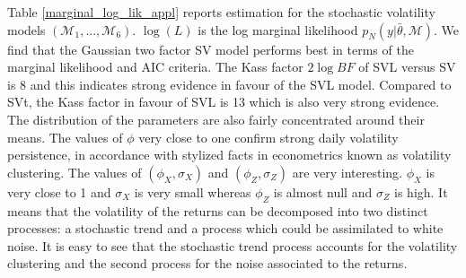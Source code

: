 \documentclass[11pt,a4,twosided,singlespacing,titlepagenumber=on]{scrreprt}
\numberwithin{equation}{chapter} %
\theoremstyle{remark}
\begin{document}
Table \ref{marginal_log_lik_appl} reports estimation for the stochastic volatility models $(\mathcal{M}_1, ..., \mathcal{M}_6)$. $\log (L)$ is the log marginal likelihood $p_N(y|\bar{\theta}, \mathcal{M})$. We find that the Gaussian two factor SV model performs best in terms of the marginal likelihood and AIC criteria. The Kass factor $2 \log BF$ of SVL versus SV is 8 and this indicates strong evidence in favour of the SVL model. Compared to SVt, the Kass factor in favour of SVL is 13 which is also very strong evidence. The distribution of the parameters are also fairly concentrated around their means. The values of $\phi$ very close to one confirm strong daily volatility persistence, in accordance with stylized facts in econometrics known as volatility clustering. The values of $(\phi_X, \sigma_X)$ and $(\phi_Z, \sigma_Z)$ are very interesting. $\phi_X$ is very close to 1 and $\sigma_X$ is very small whereas $\phi_Z$ is almost null and $\sigma_Z$ is high. It means that the volatility of the returns can be decomposed into two distinct processes: a stochastic trend and a process which could be assimilated to white noise. It is easy to see that the stochastic trend process accounts for the volatility clustering and the second process for the noise associated to the returns.
\end{document}
